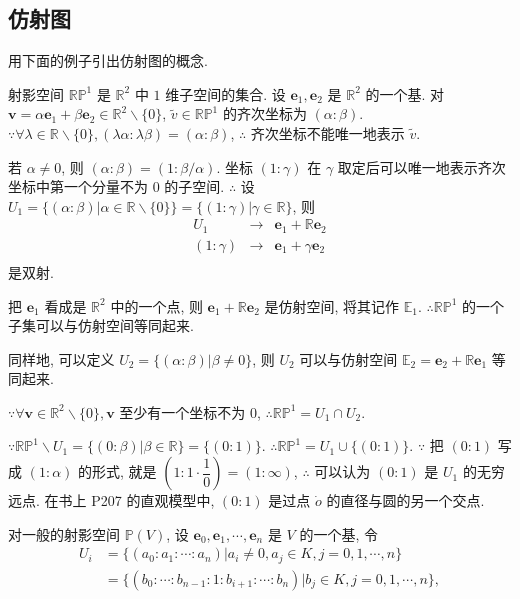 \documentclass{ctexart}
\begin{document}
\subsection{仿射图}
用下面的例子引出仿射图的概念.
\begin{example}
    射影空间 $\mathbb{RP}^1$ 是 $\mathbb{R}^2$ 中 $1$ 维子空间的集合. 设 $\boldsymbol{e}_1,\boldsymbol{e}_2$ 是 $\mathbb{R}^2$ 的一个基. 对 $\boldsymbol{v}=\alpha\boldsymbol{e}_1+\beta\boldsymbol{e}_2\in\mathbb{R}^2\backslash\{0\}$, $\tilde{v}\in\mathbb{RP}^1$ 的齐次坐标为 $(\alpha:\beta)$. $\because\forall\lambda\in\mathbb{R}\backslash\{0\},(\lambda\alpha:\lambda\beta)=(\alpha:\beta)$, $\therefore$ 齐次坐标不能唯一地表示 $\tilde{v}$.
    
    若 $\alpha\neq0$, 则 $(\alpha:\beta)=(1:\beta/\alpha)$. 坐标 $(1:\gamma)$ 在 $\gamma$ 取定后可以唯一地表示齐次坐标中第一个分量不为 $0$ 的子空间. $\therefore$ 设 $U_1=\{(\alpha:\beta)|\alpha\in\mathbb{R}\backslash\{0\}\}=\{(1:\gamma)|\gamma\in\mathbb{R}\}$, 则
    \[\begin{array}{rcl}
        U_1 & \to & \boldsymbol{e}_1+\mathbb{R}\boldsymbol{e}_2 \\
        (1:\gamma) & \to & \boldsymbol{e}_1+\gamma\boldsymbol{e}_2 \\
    \end{array}\]
    是双射.
    
    把 $\boldsymbol{e}_1$ 看成是 $\mathbb{R}^2$ 中的一个点, 则 $\boldsymbol{e}_1+\mathbb{R}\boldsymbol{e}_2$ 是仿射空间, 将其记作 $\mathbb{E}_1$. $\therefore\mathbb{RP}^1$ 的一个子集可以与仿射空间等同起来.

    同样地, 可以定义 $U_2=\{(\alpha:\beta)|\beta\neq0\}$, 则 $U_2$ 可以与仿射空间 $\mathbb{E}_2=\boldsymbol{e}_2+\mathbb{R}\boldsymbol{e}_1$ 等同起来.

    $\because\forall\boldsymbol{v}\in\mathbb{R}^2\backslash\{0\},\boldsymbol{v}$ 至少有一个坐标不为 $0$, $\therefore\mathbb{RP}^1=U_1\cap U_2$.

    $\because\mathbb{RP}^1\backslash U_1=\{(0:\beta)|\beta\in\mathbb{R}\}=\{(0:1)\}$. $\therefore\mathbb{RP}^1=U_1\cup\{(0:1)\}$. $\because$ 把 $(0:1)$ 写成 $(1:\alpha)$ 的形式, 就是 $\left(1:1\cdot\dfrac{1}{0}\right)=(1:\infty)$, $\therefore$ 可以认为 $(0:1)$ 是 $U_1$ 的无穷远点. 在书上 P207 的直观模型中, $(0:1)$ 是过点 $\dot{o}$ 的直径与圆的另一个交点.
\end{example}
对一般的射影空间 $\mathbb{P}(V)$, 设 $\boldsymbol{e}_0,\boldsymbol{e}_1,\cdots,\boldsymbol{e}_n$ 是 $V$ 的一个基, 令
\begin{align*}
    U_i & =\{(a_0:a_1:\cdots:a_n)|a_i\neq0,a_j\in K,j=0,1,\cdots,n\} \\
    & =\{(b_0:\cdots:b_{n-1}:1:b_{i+1}:\cdots:b_n)|b_j\in K,j=0,1,\cdots,n\},
\end{align*}
\end{document}
